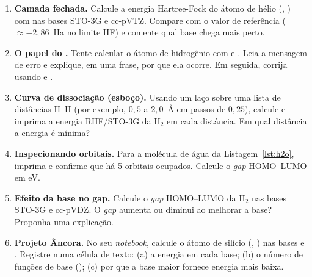 \begin{enumerate}[leftmargin=*,label=\textbf{2.\arabic*}]
  \item \textbf{Camada fechada.} Calcule a energia Hartree-Fock do átomo de hélio
        (, ) com  nas bases STO-3G e
        cc-pVTZ. Compare com o valor de referência ($\approx -2{,}86$~Ha no limite
        HF) e comente qual base chega mais perto.

  \item \textbf{O papel do .} Tente calcular o átomo de hidrogênio com
         e . Leia a mensagem de erro e explique, em uma
        frase, por que ela ocorre. Em seguida, corrija usando  e
        .

  \item \textbf{Curva de dissociação (esboço).} Usando um laço  sobre uma
        lista de distâncias H--H (por exemplo, $0{,}5$ a $2{,}0$~Å em passos de
        $0{,}25$), calcule e imprima a energia RHF/STO-3G da H$_2$ em cada
        distância. Em qual distância a energia é mínima?

  \item \textbf{Inspecionando orbitais.} Para a molécula de água da
        Listagem~\ref{lst:h2o}, imprima  e confirme que há 5
        orbitais ocupados. Calcule o \emph{gap} HOMO--LUMO em eV.

  \item \textbf{Efeito da base no gap.} Calcule o \emph{gap} HOMO--LUMO da H$_2$
        nas bases STO-3G e cc-pVDZ. O \emph{gap} aumenta ou diminui ao melhorar a
        base? Proponha uma explicação.

  \item \textbf{Projeto Âncora.} No seu \emph{notebook}, calcule o átomo de
        silício (, ) nas bases  e
        . Registre numa célula de texto: (a) a energia em cada base;
        (b) o número de funções de base (); (c) por que a base maior
        fornece energia mais baixa.
\end{enumerate}
